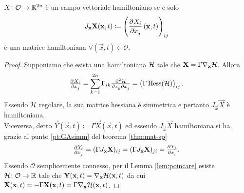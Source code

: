 \begin{thm} \label{thm:campo-hamiltoniano}
    $ X \colon \mathcal{O} \to \mathbb{R}^{2n} $ è un campo vettoriale hamiltoniano se e solo
    \begin{equation}
        J_\vec{x} \vec{X} (\vec{x}, t) \coloneqq \left(\dpd{X_i}{x_j}(\vec{x}, t)\right)_{ij}
    \end{equation}
    è una matrice hamiltoniana $ \forall (\vec{x}, t) \in \mathcal{O} $.
\end{thm}
\begin{proof}
    Supponiamo che esista una hamiltoniana $ \mathcal{H} $ tale che $ \mathbf{X} = \Gamma \nabla_{\mathbf{x}} \mathcal{H} $. Allora
    \[
        \pd{X_i}{x_j} = \sum_{k=1}^{2n} \Gamma_{ik} \md{\ham}{2}{x_k}{}{x_j}{} = \left( \Gamma \, \mathrm{Hess}(\ham) \right)_{ij}.
    \]
    Essendo $ \mathcal{H} $ regolare, la sua matrice hessiana è simmetrica e pertanto $ J_\vec{x} \vec{X} $ è hamiltoniana. \\
    Viceversa, detto $ \vec{Y}(\vec{x}, t) \coloneqq \Gamma \vec{X}(\vec{x}, t) $ ed essendo $ J_\vec{x} \vec{X} $ hamiltoniana si ha, grazie al punto \ref{pt:GAsimm} del teorema \ref{thm:mat-sp}
    \[
        \pd{Y_i}{x_j} = (\Gamma J_\vec{x} \vec{X})_{ij} = (\Gamma J_\vec{x} \vec{X})_{ji} = \pd{Y_j}{x_i}.
    \]
    Essendo $ \mathcal{O} $ semplicemente connesso, per il Lemma \ref{lem:poincare} esiste $ \mathcal{H} \colon \mathcal{O} \to \mathbb{R} $ tale che $ \mathbf{Y}(\mathbf{x}, t) = \nabla_{\mathbf{x}} \mathcal{H}(\mathbf{x}, t) $ da cui $ \mathbf{X}(\mathbf{x}, t) = -\Gamma \mathbf{X}(\mathbf{x}, t) = \Gamma \nabla_{\mathbf{x}} \mathcal{H}(\mathbf{x}, t) $.
\end{proof}

